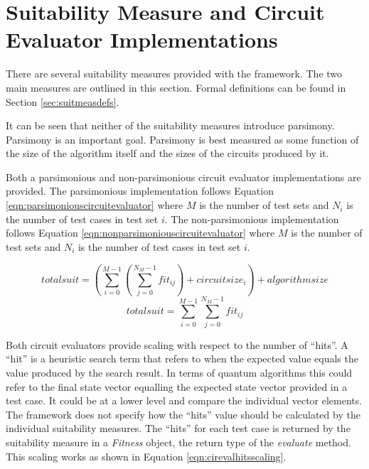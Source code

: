 \section{Suitability Measure and Circuit Evaluator Implementations}
\label{sec:provsuitmeas}

There are several suitability measures provided with the framework.
The two main measures are outlined in this section.
Formal definitions can be found in Section \ref{sec:suitmeasdefs}.

It can be seen that neither of the suitability measures introduce parsimony.
Parsimony is an important goal.
Parsimony is best measured as some function of the size of the algorithm itself and the sizes of the circuits produced by it.

Both a parsimonious and non-parsimonious circuit evaluator implementations are provided.
The parsimonious implementation follows Equation \ref{eqn:parsimoniouscircuitevaluator} where $M$ is the number of test sets and $N_i$ is the number of test cases in test set $i$.
The non-parsimonious implementation follows Equation \ref{eqn:nonparsimoniouscircuitevaluator} where $M$ is the number of test sets and $N_i$ is the number of test cases in test set $i$.

\begin{equation}
 totalsuit = (\sum_{i=0}^{M-1}(\sum_{j=0}^{N_M-1}fit_{ij})+circuitsize_i)+algorithmsize
\label{eqn:parsimoniouscircuitevaluator}
\end{equation}
\begin{equation}
 totalsuit = \sum_{i=0}^{M-1}\sum_{j=0}^{N_M-1}fit_{ij}
\label{eqn:nonparsimoniouscircuitevaluator}
\end{equation}

Both circuit evaluators provide scaling with respect to the number of ``hits''.
A ``hit'' is a heuristic search term that refers to when the expected value equals the value produced by the search result.
In terms of quantum algorithms this could refer to the final state vector equalling the expected state vector provided in a test case.
It could be at a lower level and compare the individual vector elements.
The framework does not specify how the ``hits'' value should be calculated by the individual suitability measures.
The ``hits'' for each test case is returned by the suitability measure in a \emph{Fitness} object, the return type of the \emph{evaluate} method.
This scaling works as shown in Equation \ref{eqn:cirevalhitsscaling}.

